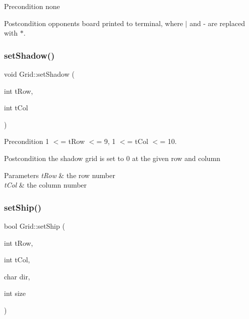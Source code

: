 \begin{DoxyPrecond}{Precondition}
none 
\end{DoxyPrecond}
\begin{DoxyPostcond}{Postcondition}
opponent\textquotesingle{}s board printed to terminal, where \textquotesingle{}$\vert$\textquotesingle{} and \textquotesingle{}-\/\textquotesingle{} are replaced with \textquotesingle{}$\ast$\textquotesingle{}. 
\end{DoxyPostcond}
\mbox{\label{classGrid_ab04f98c62f74cbf487a49e535c38c93d}} 
\subsubsection{\texorpdfstring{set\+Shadow()}{setShadow()}}
{\footnotesize\ttfamily void Grid\+::set\+Shadow (\begin{DoxyParamCaption}\item[{int}]{t\+Row,  }\item[{int}]{t\+Col }\end{DoxyParamCaption})}

\begin{DoxyPrecond}{Precondition}
1 $<$= t\+Row $<$= 9, 1 $<$= t\+Col $<$= 10. 
\end{DoxyPrecond}
\begin{DoxyPostcond}{Postcondition}
the shadow grid is set to 0 at the given row and column 
\end{DoxyPostcond}

\begin{DoxyParams}{Parameters}
{\em t\+Row} & the row number \\
\hline
{\em t\+Col} & the column number \\
\hline
\end{DoxyParams}
\mbox{\label{classGrid_ae1ab8719d4320fce79999814ebd03e18}} 
\subsubsection{\texorpdfstring{set\+Ship()}{setShip()}}
{\footnotesize\ttfamily bool Grid\+::set\+Ship (\begin{DoxyParamCaption}\item[{int}]{t\+Row,  }\item[{int}]{t\+Col,  }\item[{char}]{dir,  }\item[{int}]{size }\end{DoxyParamCaption})}



